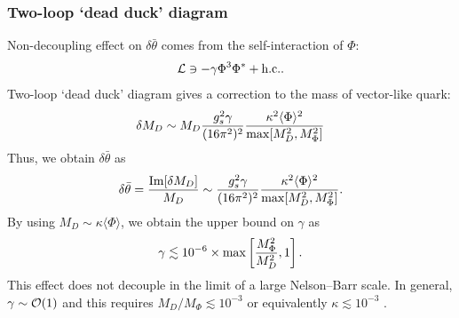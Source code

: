 \documentclass[11pt,a4paper]{article}
\begin{document}
\subsubsection*{Two-loop `dead duck' diagram}
Non-decoupling effect on $\delta\bar\theta$ comes from the self-interaction of $\Phi$:
\begin{align}
    {\cal L} \ni -\gamma \Phi^3 \Phi^* + {\rm h.c.}. \label{eq:phi self}
\end{align}
Two-loop `dead duck' diagram \cite{Nelson:1983zb} gives a correction to the mass of vector-like quark:
\begin{align}
    \delta M_D \sim M_D \frac{g_s^2 \gamma}{(16\pi^2)^2} \frac{\kappa^2 \langle\Phi\rangle^2}{{\rm max}[M_D^2,M_\Phi^2]}
\end{align}
Thus, we obtain $\delta \bar\theta$ as
\begin{align}
    \delta\bar\theta = \frac{{\rm Im}[\delta M_D]}{M_D} \sim \frac{g_s^2 \gamma}{(16\pi^2)^2} \frac{\kappa^2 \langle\Phi\rangle^2}{{\rm max}[M_D^2,M_\Phi^2]}.
\end{align}
By using $M_D \sim \kappa \langle \Phi \rangle$, we obtain the upper bound on $\gamma$ as
\begin{align}
    \gamma \lesssim 10^{-6} \times {\rm max}\left[ \frac{M_\Phi^2}{M_D^2}, 1 \right]. \label{eq:quality selfcoupling}
\end{align}
This effect does not decouple in the limit of a large Nelson--Barr scale.
In general, $\gamma \sim {\cal O}(1)$ and this requires $M_D / M_\Phi \lesssim 10^{-3}$ or equivalently $\kappa \lesssim 10^{-3}$ \cite{Perez:2020dbw}.
\end{document}

